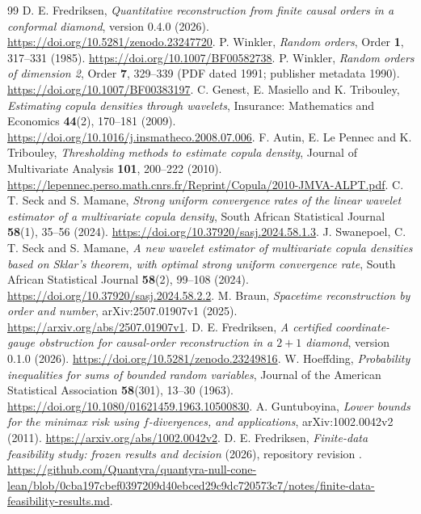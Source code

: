 \documentclass[11pt]{article}
\theoremstyle{remark}
\begin{document}
\begin{thebibliography}{99}
 D. E. Fredriksen,
\emph{Quantitative reconstruction from finite causal orders in a conformal
diamond}, version 0.4.0 (2026).
\url{https://doi.org/10.5281/zenodo.23247720}.
 P. Winkler, \emph{Random orders},
Order \textbf{1}, 317--331 (1985).
\url{https://doi.org/10.1007/BF00582738}.
 P. Winkler, \emph{Random orders of dimension 2},
Order \textbf{7}, 329--339 (PDF dated 1991; publisher metadata 1990).
\url{https://doi.org/10.1007/BF00383197}.
 C. Genest, E. Masiello and K. Tribouley,
\emph{Estimating copula densities through wavelets},
Insurance: Mathematics and Economics \textbf{44}(2), 170--181 (2009).
\url{https://doi.org/10.1016/j.insmatheco.2008.07.006}.
 F. Autin, E. Le Pennec and K. Tribouley,
\emph{Thresholding methods to estimate copula density},
Journal of Multivariate Analysis \textbf{101}, 200--222 (2010).
\url{https://lepennec.perso.math.cnrs.fr/Reprint/Copula/2010-JMVA-ALPT.pdf}.
 C. T. Seck and S. Mamane,
\emph{Strong uniform convergence rates of the linear wavelet estimator
of a multivariate copula density}, South African Statistical Journal
\textbf{58}(1), 35--56 (2024).
\url{https://doi.org/10.37920/sasj.2024.58.1.3}.
 J. Swanepoel, C. T. Seck and S. Mamane,
\emph{A new wavelet estimator of multivariate copula densities based on
Sklar's theorem, with optimal strong uniform convergence rate},
South African Statistical Journal \textbf{58}(2), 99--108 (2024).
\url{https://doi.org/10.37920/sasj.2024.58.2.2}.
 M. Braun, \emph{Spacetime reconstruction by order and
number}, arXiv:2507.01907v1 (2025).
\url{https://arxiv.org/abs/2507.01907v1}.
 D. E. Fredriksen,
\emph{A certified coordinate-gauge obstruction for causal-order
reconstruction in a $2+1$ diamond}, version 0.1.0 (2026).
\url{https://doi.org/10.5281/zenodo.23249816}.
 W. Hoeffding,
\emph{Probability inequalities for sums of bounded random variables},
Journal of the American Statistical Association \textbf{58}(301),
13--30 (1963).
\url{https://doi.org/10.1080/01621459.1963.10500830}.
 A. Guntuboyina,
\emph{Lower bounds for the minimax risk using $f$-divergences, and
applications}, arXiv:1002.0042v2 (2011).
\url{https://arxiv.org/abs/1002.0042v2}.
 D. E. Fredriksen, \emph{Finite-data feasibility study:
frozen results and decision} (2026), repository revision
.
\url{https://github.com/Quantyra/quantyra-null-cone-lean/blob/0cba197cbef0397209d40ebced29c9dc720573c7/notes/finite-data-feasibility-results.md}.
\end{thebibliography}
\end{document}
